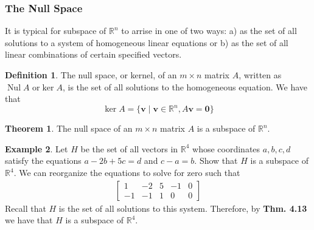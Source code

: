 \documentclass{article}
\numberwithin{equation}{section}
\theoremstyle{definition}
\newtheorem{thm}{Theorem}[subsection]
\newtheorem{defn}{Definition}[subsection]
\newtheorem{ex}[thm]{Example}
\newcommand{\V}{\mathbf{v}}
\newcommand{\R}{\mathbb{R}}
\DeclareMathOperator{\nul}{Nul}
\newcommand{\x}{\times}
\theoremstyle{adefn}
\begin{document}
	\subsubsection{The Null Space}
	It is typical for subspace of $\R^n$ to arrise in one of two ways: a) as the set of all solutions to a system of homogeneous linear equations or b) as the set of all linear combinations of certain specified vectors. 
	\begin{defn}
		The null space, or kernel, of an $m \x n$ matrix $A$, written as $\nul A  \text{ or} \ker A$, is the set of all solutions to the homogeneous equation. We have that 
		$$\ker A = \{ \V \mid \V \in \R^n, A\V = \textbf{0} \}$$
	\end{defn}
	\begin{thm}
		The null space of an $m \x n$ matrix $A$ is a subspace of $\R^n$. 
	\end{thm}
	\begin{ex}
		Let $H$ be the set of all vectors in $\R^4$ whose coordinates $a, b, c, d$ satisfy the equations $a-2b+5c=d$ and $c-a=b$. Show that $H$ is a subspace of $\R^4$. We can reorganize the equations to solve for zero such that 
		\begin{align*}
			\begin{bmatrix}
				1 & -2 & 5 & -1 & 0 \\ 
				-1 & -1 & 1 & 0 & 0
			\end{bmatrix}
		\end{align*}
		Recall that $H$ is the set of all solutions to this system. Therefore, by \textbf{Thm. 4.13} we have that $H$ is a subspace of $\R^4$.  
	\end{ex}
\end{document}
